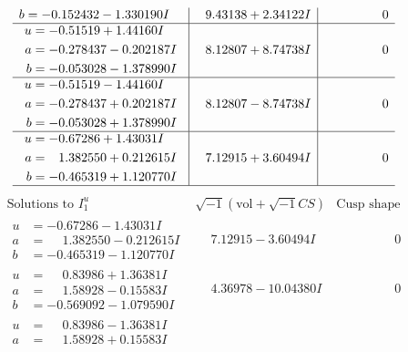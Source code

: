 \documentclass[1p]{elsarticle_modified}
\theoremstyle{definition}
\newcommand{\I}{\sqrt{-1}}
\begin{document}
$$\begin{array}{c|c|c}
\begin{aligned}
b &= -0.152432 - 1.330190 I\end{aligned}
 & \phantom{-}9.43138 + 2.34122 I & \phantom{-0.000000 } 0 \\ \hline\begin{aligned}
u &= -0.51519 + 1.44160 I \\
a &= -0.278437 - 0.202187 I \\
b &= -0.053028 - 1.378990 I\end{aligned}
 & \phantom{-}8.12807 + 8.74738 I & \phantom{-0.000000 } 0 \\ \hline\begin{aligned}
u &= -0.51519 - 1.44160 I \\
a &= -0.278437 + 0.202187 I \\
b &= -0.053028 + 1.378990 I\end{aligned}
 & \phantom{-}8.12807 - 8.74738 I & \phantom{-0.000000 } 0 \\ \hline\begin{aligned}
u &= -0.67286 + 1.43031 I \\
a &= \phantom{-}1.382550 + 0.212615 I \\
b &= -0.465319 + 1.120770 I\end{aligned}
 & \phantom{-}7.12915 + 3.60494 I & \phantom{-0.000000 } 0\\
 \hline 
 \end{array}$$\newpage$$\begin{array}{c|c|c}  
\text{Solutions to }I^u_{1}& \I (\text{vol} + \sqrt{-1}CS) & \text{Cusp shape}\\
 \hline 
\begin{aligned}
u &= -0.67286 - 1.43031 I \\
a &= \phantom{-}1.382550 - 0.212615 I \\
b &= -0.465319 - 1.120770 I\end{aligned}
 & \phantom{-}7.12915 - 3.60494 I & \phantom{-0.000000 } 0 \\ \hline\begin{aligned}
u &= \phantom{-}0.83986 + 1.36381 I \\
a &= \phantom{-}1.58928 - 0.15583 I \\
b &= -0.569092 - 1.079590 I\end{aligned}
 & \phantom{-}4.36978 - 10.04380 I & \phantom{-0.000000 } 0 \\ \hline\begin{aligned}
u &= \phantom{-}0.83986 - 1.36381 I \\
a &= \phantom{-}1.58928 + 0.15583 I \\

\end{aligned}
\end{array}$$
\end{document}
